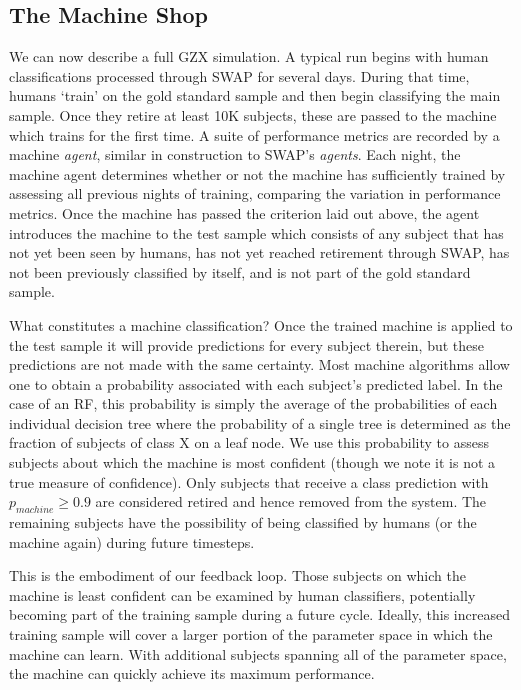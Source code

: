 \documentclass[twocolumn]{aastex6}
\begin{document}
\subsection{The Machine Shop}\label{sec: machine shop}
We can now describe a full GZX simulation. A typical run begins with human classifications 
processed through SWAP for several days. During that time, humans `train' on the 
gold standard sample and then begin classifying the main sample.  Once they retire 
at least 10K subjects, these are passed to the machine which trains for the first time. 
A suite of performance metrics are recorded by a machine \textit{agent}, similar
in construction to SWAP's \textit{agents}. Each night, the machine agent determines 
whether or not the machine has sufficiently trained by assessing all previous nights of 
training, comparing the variation in performance metrics. Once the machine has
passed the criterion laid out above, the agent introduces the machine to the test sample
which consists of any subject that has not yet been seen by humans, has not yet 
reached retirement through SWAP, has not been previously classified by itself, 
and is not part of the gold standard sample.  

What constitutes a machine classification? Once the trained machine is applied to
the test sample it will provide predictions for every subject therein, but these predictions
are not made with the same certainty. Most machine algorithms allow one to obtain
a probability associated with each subject's predicted label. 
In the case of an RF, this probability is simply the average of the probabilities of each 
individual decision tree where the probability of a single tree is determined as the fraction
of subjects of class X on a leaf node.  We use this probability to assess subjects about which
the machine is most confident (though we note it is not a true measure of confidence).
Only subjects that receive a class prediction with $p_{machine} \ge 0.9$ are considered
retired and hence removed from the system. The remaining subjects have the possibility 
of being classified by humans (or the machine again) during future timesteps. 


This is the embodiment of our feedback loop. Those subjects on which the machine
is least confident can be examined by human classifiers, potentially becoming part of the
training sample during a future cycle. Ideally, this increased training sample will 
cover a larger portion of the parameter space in which the machine can learn. 
With additional subjects spanning all of the parameter space, 
the machine can quickly achieve its maximum performance. 
\end{document}
